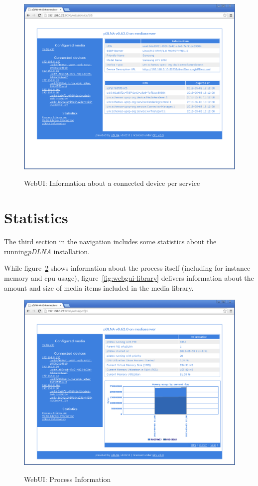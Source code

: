 \documentclass[a4paper,oneside,10pt]{report}
\begin{document}
\begin{figure}
	\centering
		\includegraphics[width=34em]{images/webui_device_ip_service}
	\label{fig:webgui-connecteddevice-service}
	\caption{WebUI: Information about a connected device per service}
\end{figure}

\section{Statistics}

The third section in the navigation includes some statistics about the running{\em pDLNA} installation.

While figure~\ref{fig:webgui-process} shows information about the process itself (including for instance memory and cpu usage), figure~\ref{fig:webgui-library} delivers information about the amount and size of media items included in the media library.

\begin{figure}
	\centering
		\includegraphics[width=34em]{images/webui_stats_process}
	\label{fig:webgui-process}
	\caption{WebUI: Process Information}
\end{figure}
\end{document}
